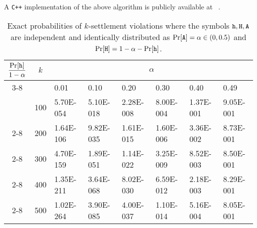A \texttt{C++} implementation of the above algorithm is publicly available 
at
~\cite{PrForkableMultihonestCode}.



\newcommand{\EndRow}{\cline{2-8} \multicolumn{1}{|c||}{} &}


\begin{table}[t]
	\centering
	\caption[Exact settlement error probabilities for trivalent characteristic strings]{
    Exact probabilities of $k$-settlement violations 
    where the symbols $\mathtt{h}, \mathtt{H}, \mathtt{A}$ are independent and identically distributed as $\Pr[\mathtt{A}] = \alpha \in (0, 0.5)$ and $\Pr[\mathtt{H}] = 1 - \alpha - \Pr[\mathtt{h}]$.    
	} 
	\label{table:exact-probs-mh}


	\begin{tabular}{|c||l||l|l|l|l|l|l|}
    \hline
    \multirow{2}{*}{$\dfrac{\Pr[\mathtt{h}]}{1-\alpha}$} & 
  	\multicolumn{1}{|c||}{\multirow{2}{*}{$k$}} & 
    \multicolumn{6}{c|}{$\alpha$} \\ 
    \cline{3-8} 
    \multicolumn{1}{|c||}{} &
  	\multicolumn{1}{|c||}{} &
    0.01 & 0.10 & 0.20 & 0.30 & 0.40 & 0.49\\ 
  	\hhline{|=#=#=|=|=|=|=|=|}
    \multicolumn{1}{|c||}{\multirow{5}{*}{$1.0$}}&
    100 & 5.70E-054 & 5.10E-018 & 2.28E-008 & 8.00E-004 & 1.37E-001 & 9.05E-001 \\ \EndRow
    200 & 1.64E-106 & 9.82E-035 & 1.61E-015 & 1.60E-006 & 3.36E-002 & 8.73E-001 \\ \EndRow
    300 & 4.70E-159 & 1.89E-051 & 1.14E-022 & 3.25E-009 & 8.52E-003 & 8.50E-001 \\ \EndRow
    400 & 1.35E-211 & 3.64E-068 & 8.02E-030 & 6.59E-012 & 2.18E-003 & 8.29E-001 \\ \EndRow
    500 & 1.02E-264 & 3.90E-085 & 4.00E-037 & 1.10E-014 & 5.16E-004 & 8.05E-001 \\%


\end{tabular}
\end{table}
